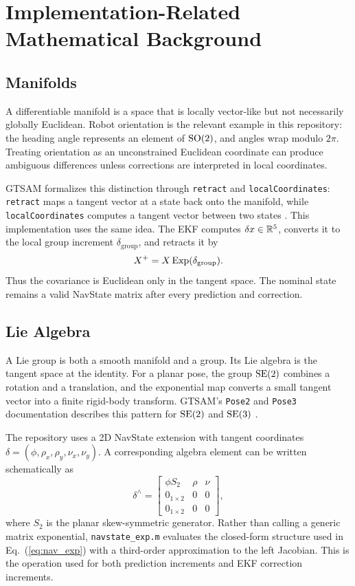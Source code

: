 \appendix
\section{Implementation-Related Mathematical Background}

\subsection{Manifolds}

A differentiable manifold is a space that is locally vector-like but not necessarily globally Euclidean. Robot orientation is the relevant example in this repository: the heading angle represents an element of \(\mathrm{SO}(2)\), and angles wrap modulo \(2\pi\). Treating orientation as an unconstrained Euclidean coordinate can produce ambiguous differences unless corrections are interpreted in local coordinates.

GTSAM formalizes this distinction through \texttt{retract} and \texttt{localCoordinates}: \texttt{retract} maps a tangent vector at a state back onto the manifold, while \texttt{localCoordinates} computes a tangent vector between two states \citep{gtsamConcepts,gtsamPose2,gtsamPose3}. This implementation uses the same idea. The EKF computes \(\delta x\in\mathbb{R}^5\), converts it to the local group increment \(\delta_{\mathrm{group}}\), and retracts it by
\[
    X^{+}=X\operatorname{Exp}(\delta_{\mathrm{group}}).
\]
Thus the covariance is Euclidean only in the tangent space. The nominal state remains a valid NavState matrix after every prediction and correction.

\subsection{Lie Algebra}

A Lie group is both a smooth manifold and a group. Its Lie algebra is the tangent space at the identity. For a planar pose, the group \(\mathrm{SE}(2)\) combines a rotation and a translation, and the exponential map converts a small tangent vector into a finite rigid-body transform. GTSAM's \texttt{Pose2} and \texttt{Pose3} documentation describes this pattern for \(\mathrm{SE}(2)\) and \(\mathrm{SE}(3)\) \citep{gtsamPose2,gtsamPose3}.

The repository uses a 2D NavState extension with tangent coordinates \(\delta=(\phi,\rho_x,\rho_y,\nu_x,\nu_y)\). A corresponding algebra element can be written schematically as
\[
\delta^\wedge =
\begin{bmatrix}
\phi S_2 & \rho & \nu\\
0_{1\times 2} & 0 & 0\\
0_{1\times 2} & 0 & 0
\end{bmatrix},
\]
where \(S_2\) is the planar skew-symmetric generator. Rather than calling a generic matrix exponential, \texttt{navstate\_exp.m} evaluates the closed-form structure used in Eq.~(\ref{eq:nav_exp}) with a third-order approximation to the left Jacobian. This is the operation used for both prediction increments and EKF correction increments.

